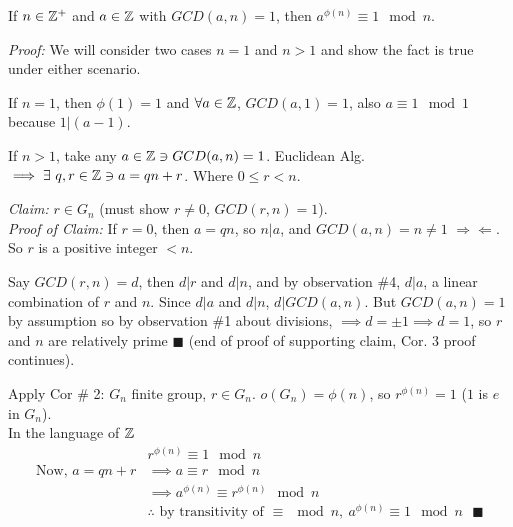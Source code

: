 \setcounter{dummy_lemma}{0}
\begin{corollary}
If $n\in {\mathbb{Z}}^+$ and $a\in {\mathbb{Z}}$ with $GCD(a,n)=1$, then $a^{\phi(n)}\equiv 1 \mod n$. \steezybreak

\noindent \textit{Proof:} We will consider two cases $n=1$ and $n>1$ and show the fact is true under
either scenario. \steezybreak

\noindent If $n=1$, then $\phi(1)=1$ and $\forall a \in {\mathbb{Z}}$, $GCD(a,1)=1$, also $a\equiv 1 \mod 1$
because $1|(a-1)$.\steezybreak

\noindent If $n>1$, take any $a\in {\mathbb{Z}} \ni GCD(a,n)=1$. Euclidean Alg.
$\implies \exists \ q,r \in {\mathbb{Z}} \ni a=qn+r$. Where $0\leq r < n$.\steezybreak

\noindent \textit{Claim:} $r\in G_n$ (must show $r\neq 0$, $GCD(r,n)=1$). \\
\textit{Proof of Claim: }If $r=0$, then $a=qn$, so $n|a$, and $GCD(a,n)=n\neq 1$
$\Rightarrow\Leftarrow$. So $r$ is a positive integer $<  n$. \steezybreak

\noindent Say $GCD(r,n)=d$, then $d|r$ and $d|n$, and by observation \#4, $d|a$, a linear
combination of $r$ and $n$. Since $d|a$ and $d|n$, $d|GCD(a,n)$. But $GCD(a,n)=1$ by assumption so
by observation \#1 about divisions, $\implies d= \pm 1 \implies d= 1$, so $r$ and $n$ are relatively
prime $\blacksquare$ (end of proof of supporting claim, Cor. 3 proof continues).\steezybreak

\noindent Apply Cor \# 2: $G_n$ finite group, $r\in G_n$. $o(G_n)=\phi(n)$, so $r^{\phi(n)}=1$ ($1$
is $e$ in $G_n$).\\
In the language of ${\mathbb{Z}}$
\begin{align}
    &r^{\phi(n)}\equiv 1 \mod n\nonumber \\
    \text{Now, } a=qn+r &\implies a\equiv r \mod n \nonumber \\
    &\implies a^{\phi(n)} \equiv r^{\phi(n)}\mod n \nonumber \\
    &\therefore \text{ by transitivity of }\equiv \mod n, \ a^{\phi(n)}\equiv 1 \mod n \ \ \ \blacksquare \nonumber
\end{align}
\end{corollary}

